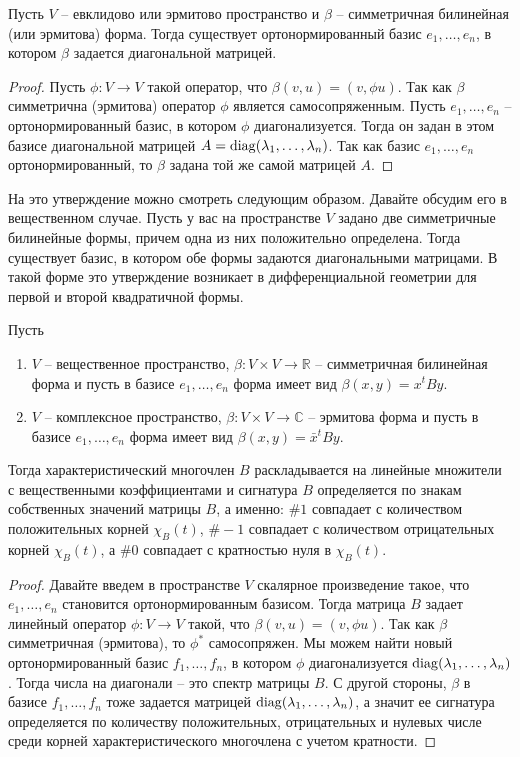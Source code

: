 \begin{claim}
\label{claim::BilinOrthoDiag}
Пусть $V$ -- евклидово или эрмитово пространство и $\beta$ -- симметричная билинейная (или эрмитова) форма.
Тогда существует ортонормированный базис $e_1,\ldots,e_n$, в котором $\beta$ задается диагональной матрицей.
\end{claim}
\begin{proof}
Пусть $\phi\colon V\to V$ такой оператор, что $\beta(v, u) = (v, \phi u)$.
Так как $\beta$ симметрична (эрмитова) оператор $\phi$ является самосопряженным.
Пусть $e_1,\ldots,e_n$ -- ортонормированный базис, в котором $\phi$ диагонализуется.
Тогда он задан в этом базисе диагональной матрицей $A = \operatorname{diag}(\lambda_1,\ldots,\lambda_n)$.
Так как базис $e_1,\ldots,e_n$ ортонормированный, то $\beta$ задана той же самой матрицей $A$.
\end{proof}

На это утверждение можно смотреть следующим образом.
Давайте обсудим его в вещественном случае.
Пусть у вас на пространстве $V$ задано две симметричные билинейные формы, причем одна из них положительно определена.
Тогда существует базис, в котором обе формы задаются диагональными матрицами.
В такой форме это утверждение возникает в дифференциальной геометрии для первой и второй квадратичной формы.

\begin{claim}
Пусть 
\begin{enumerate}
\item
$V$ -- вещественное пространство, $\beta\colon V\times V\to \mathbb R$ -- симметричная билинейная форма и пусть в базисе $e_1,\ldots,e_n$ форма имеет вид $\beta(x, y) = x^t B y$.

\item
$V$ -- комплексное пространство, $\beta\colon V\times V\to \mathbb C$ -- эрмитова форма и пусть в базисе $e_1,\ldots,e_n$ форма имеет вид $\beta(x, y) = \bar x^t B y$.

\end{enumerate}
Тогда характеристический многочлен $B$ раскладывается на линейные множители с вещественными коэффициентами и сигнатура $B$ определяется по знакам собственных значений матрицы $B$, а именно: $\#1$ совпадает с количеством положительных корней $\chi_B(t)$, $\#-1$ совпадает с количеством отрицательных корней $\chi_B(t)$, а $\#0$ совпадает с кратностью нуля в $\chi_B(t)$.
\end{claim}
\begin{proof}
Давайте введем в пространстве $V$ скалярное произведение такое, что $e_1,\ldots,e_n$ становится ортонормированным базисом.
Тогда матрица $B$ задает линейный оператор $\phi\colon V \to V$ такой, что $\beta(v, u) = (v, \phi u)$.
Так как $\beta$ симметричная (эрмитова), то $\phi^*$ самосопряжен.
Мы можем найти новый ортонормированный базис $f_1,\ldots,f_n$, в котором $\phi$ диагонализуется $\operatorname{diag}(\lambda_1,\ldots,\lambda_n)$.
Тогда числа на диагонали -- это спектр матрицы $B$.
С другой стороны, $\beta$ в базисе $f_1,\ldots,f_n$ тоже задается матрицей $\operatorname{diag}(\lambda_1,\ldots,\lambda_n)$, а значит ее сигнатура определяется по количеству положительных, отрицательных и нулевых числе среди корней характеристического многочлена с учетом кратности.
\end{proof}

